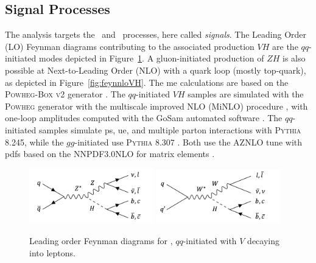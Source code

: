 \subsection{Signal Processes}
The analysis targets the \vhb\ and \vhc\ processes, here called \textit{signals}. The Leading Order (LO) Feynman diagrams contributing to the associated production $VH$ are the $qq$-initiated modes depicted in Figure~\ref{fig:feynloVH}. A gluon-initiated production of $ZH$ is also possible at Next-to-Leading Order (NLO) with a quark loop (mostly top-quark), as depicted in Figure~\ref{fig:feynnloVH}. The \gls{me} calculations are based on the \textsc{Powheg-Box v2} generator \cite{StefanoFrixione_20072, POWHEGBOX}. The $qq$-initiated $VH$ samples are simulated with the \textsc{Powheg} generator with the multiscale improved NLO (MiNLO) procedure \cite{powhegHW}, with one-loop amplitudes computed with the GoSam automated software \cite{gosam}. The $qq$-initiated samples simulate \gls{ps}, \gls{ue}, and multiple parton interactions with \textsc{Pythia} 8.245, while the $gg$-initiated use \textsc{Pythia} 8.307 \cite{SJOSTRAND2015159}. Both use the AZNLO tune \cite{measureZGboson} with \glspl{pdf} based on the \textsc{NNPDF3.0NLO} for matrix elements \cite{PDFLHCrun2}. \\

\begin{figure}[h!]
  \center
  \includegraphics[width=0.48\textwidth]{Images/VH/Feynman/zh.png}
  \includegraphics[width=0.48\textwidth]{Images/VH/Feynman/wh.png}
  \caption{Leading order Feynman diagrams for \vhbc, $qq$-initiated with $V$ decaying into leptons.} 
  \label{fig:feynloVH}
\end{figure}

